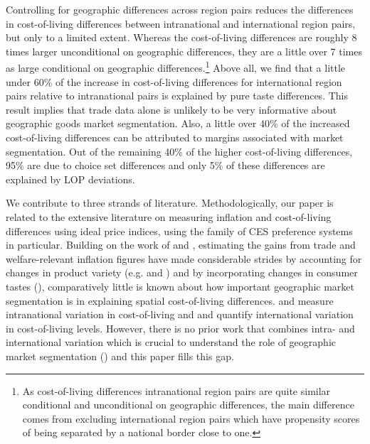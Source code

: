 Controlling for geographic differences across region pairs reduces the differences in cost-of-living differences between intranational and international region pairs, but only to a limited extent. Whereas the cost-of-living differences are roughly 8 times larger unconditional on geographic differences, they are a little over 7 times as large conditional on geographic differences.\footnote{As cost-of-living differences intranational region pairs are quite similar conditional and unconditional on geographic differences, the main difference comes from excluding international region pairs which have propensity scores of being separated by a national border close to one.} Above all, we find that a little under 60\% of the increase in cost-of-living differences for international region pairs relative to intranational pairs is explained by pure taste differences. This result implies that trade data alone is unlikely to be very informative about geographic goods market segmentation. Also, a little over 40\% of the increased cost-of-living differences can be attributed to margins associated with market segmentation. Out of the remaining 40\% of the higher cost-of-living differences, 95\% are due to choice set differences and only 5\% of these differences are explained by LOP deviations. 


We contribute to three strands of literature. Methodologically, our paper is related to the extensive literature on measuring inflation and cost-of-living differences using ideal price indices, using the family of CES preference systems in particular. Building on the work of \citet{Sato1976} and \citet{Vartia1976}, estimating the gains from trade and welfare-relevant inflation figures have made considerable strides by accounting for changes in product variety (e.g. \citet{Feenstra1994} and \citet{Broda2006}) and by incorporating changes in consumer tastes (\citet{Redding2020}), comparatively little is known about how important geographic market segmentation is in explaining spatial cost-of-living differences. \citet{Handbury2015} and \citet{Feenstra2020} measure intranational variation in cost-of-living and \cite{Argente2021} and \citet{Cavallo2022} quantify international variation in cost-of-living levels. However, there is no prior work that combines intra- and international variation which is crucial to understand the role of geographic market segmentation (\citet{Anderson2004}) and this paper fills this gap.

